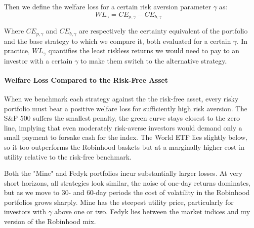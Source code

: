 Then we define the welfare loss for a certain risk aversion parameter $\gamma$ as:
\begin{equation}
    WL_{\gamma} = CE_{p, \gamma} - CE_{b, \gamma}
\end{equation}

Where $CE_{p, \gamma}$ and $CE_{b, \gamma}$ are respectively the certainty equivalent of the portfolio and the base strategy to which we compare it, both evaluated for a certain $\gamma$.
In practice, $WL_\gamma$ quantifies the least riskless returns we would need to pay to an investor with a certain $\gamma$ to make them switch to the alternative strategy.

\paragraph{Welfare Loss Compared to the Risk-Free Asset}
When we benchmark each strategy against the the risk-free asset, every risky portfolio must bear a positive welfare loss for sufficiently high risk aversion. 
The S\&P 500 suffers the smallest penalty, the green curve stays closest to the zero line, implying that even moderately risk-averse investors would demand only a small payment to forsake cash for the index. 
The World ETF lies slightly below, so it too outperforms the Robinhood baskets but at a marginally higher cost in utility relative to the risk-free benchmark.

Both the "Mine" and Fedyk portfolios incur substantially larger losses.
At very short horizons, all strategies look similar, the noise of one-day returns dominates, but as we move to 30- and 60-day periods the cost of volatility in the Robinhood portfolios grows sharply. 
Mine has the steepest utility price, particularly for investors with $\gamma$ above one or two. 
Fedyk lies between the market indices and my version of the Robinhood mix.

